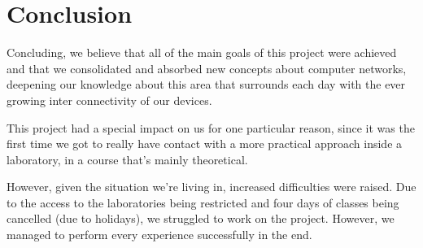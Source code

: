 \documentclass[11pt]{report}
\begin{document}
\chapter{Conclusion}

Concluding, we believe that all of the main goals of this project were achieved and that we consolidated and absorbed new concepts about computer networks, deepening our knowledge about this area that surrounds each day with the ever growing inter connectivity of our devices.

This project had a special impact on us for one particular reason, since it was the first time we got to really have contact with a more practical approach inside a laboratory, in a course that's mainly theoretical.

However, given the situation we're living in, increased difficulties were raised. Due to the access to the laboratories being restricted and four days of classes being cancelled (due to holidays), we struggled to work on the project. 
However, we managed to perform every experience successfully in the end.
\end{document}
